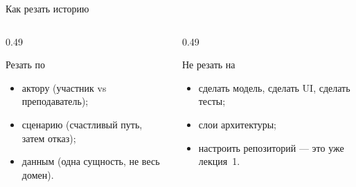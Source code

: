 \begin{frame}{Как резать историю}

  \medskip
  \begin{columns}[T]
    \begin{column}{0.49\textwidth}
      \begin{block}{Резать по}
        \begin{itemize}\setlength\itemsep{0.28em}
          \item актору (участник vs преподаватель);
          \item сценарию (счастливый путь, затем отказ);
          \item данным (одна сущность, не \flqq весь домен\frqq).
        \end{itemize}
      \end{block}
    \end{column}
    \begin{column}{0.49\textwidth}
      \begin{block}{Не резать на}
        \begin{itemize}\setlength\itemsep{0.28em}
          \item \flqq сделать модель\frqq, \flqq сделать UI\frqq, \flqq сделать тесты\frqq;
          \item слои архитектуры;
          \item \flqq настроить репозиторий\frqq{} --- это уже лекция~1.
        \end{itemize}
      \end{block}
    \end{column}
  \end{columns}
\end{frame}
